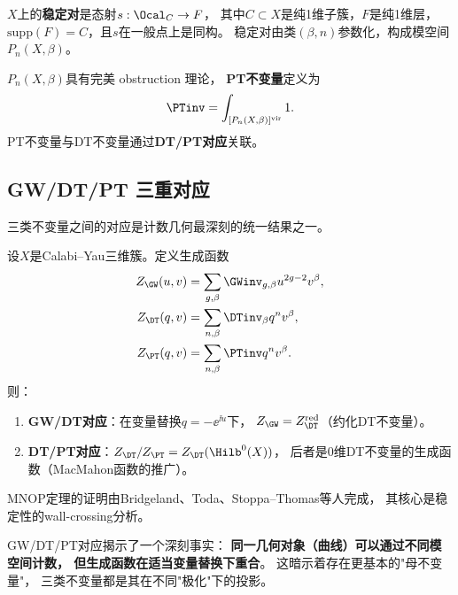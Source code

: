 \begin{definition}[稳定对]\label{def:pt}
$X$上的\textbf{稳定对}是态射$s: \Ocal_C \to F$，
其中$C \subset X$是纯1维子簇，$F$是纯1维层，
$\mathrm{supp}(F) = C$，且$s$在一般点上是同构。
稳定对由类$(\beta, n)$参数化，构成模空间$P_n(X, \beta)$。
\end{definition}

\begin{theorem}\label{thm:pt}
$P_n(X, \beta)$具有完美 obstruction 理论，
\textbf{PT不变量}定义为
\[
\PTinv = \int_{[P_n(X,\beta)]^{\mathrm{vir}}} 1.
\]
PT不变量与DT不变量通过\textbf{DT/PT对应}关联。
\end{theorem}

\subsection{GW/DT/PT 三重对应}

三类不变量之间的对应是计数几何最深刻的统一结果之一。

\begin{theorem}\label{thm:mnop}
设$X$是Calabi--Yau三维簇。定义生成函数
\begin{align*}
Z_{\GW}(u, v) &= \sum_{g, \beta} \GWinv_{g, \beta} u^{2g-2} v^\beta, \\
Z_{\DT}(q, v) &= \sum_{n, \beta} \DTinv_\beta q^n v^\beta, \\
Z_{\PT}(q, v) &= \sum_{n, \beta} \PTinv q^n v^\beta.
\end{align*}
则：
\begin{enumerate}[label=(\arabic*)]
\item \textbf{GW/DT对应}：在变量替换$q = -\ee^{\ii u}$下，
$Z_{\GW} = Z_{\DT}^{\mathrm{red}}$（约化DT不变量）。
\item \textbf{DT/PT对应}：$Z_{\DT} / Z_{\PT} = Z_{\DT}(\Hilb^0(X))$，
后者是0维DT不变量的生成函数（MacMahon函数的推广）。
\end{enumerate}
\end{theorem}

MNOP定理的证明由Bridgeland、Toda、Stoppa--Thomas等人完成，
其核心是稳定性的wall-crossing分析。

\begin{remark}[对应的几何意义]\label{rmk:correspondence}
GW/DT/PT对应揭示了一个深刻事实：
\textbf{同一几何对象（曲线）可以通过不同模空间计数，
但生成函数在适当变量替换下重合}。
这暗示着存在更基本的"母不变量"，
三类不变量都是其在不同"极化"下的投影。
\end{remark}


